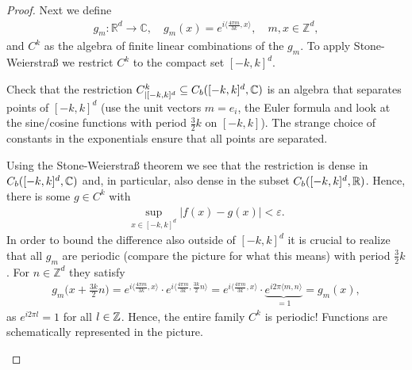 \begin{proof}[Proof]
	Next we define
	\begin{align*}
		g_m \colon \mathbb{R}^d \to \mathbb{C},\quad g_m (x) = e^{ i \langle \frac{4\pi m}{3k}, x \rangle },\quad m, x\in \mathbb{Z}^d,
	\end{align*}
	and $C^k$ as the algebra of finite linear combinations of the $g_m$. To apply Stone-Weierstra\ss{} we restrict $C^k$ to the compact set $[-k,k]^d$.
	\begin{luebung}
		Check that the restriction $C^k_{|[-k,k]^d}\subseteq C_b([-k,k]^d,\mathbb{C})$ is an algebra that separates points of $[-k,k]^d$ (use the unit vectors $m=e_i$, the Euler formula and look at the sine/cosine functions with period $\frac{3}{2} k$ on $[-k,k]$). The strange choice of constants in the exponentials ensure that all points are separated.
	\end{luebung}
	Using the Stone-Weierstra\ss{} theorem we see that the restriction is dense in $C_b([-k,k]^d,\mathbb{C})$ and, in particular, also dense in the subset $C_b([-k,k]^d,\mathbb{R})$. Hence, there is some $g \in C^k$ with 
	\begin{align*}
		\sup_{x\in [-k,k]^d}\lvert f(x) - g(x) \rvert < \varepsilon.
	\end{align*}
	In order to bound the difference also outside of $[-k,k]^d$ it is crucial to realize that all $g_m$ are periodic (compare the picture for what this means) with period $\frac{3}{2}k$. For $n \in \mathbb{Z}^d$ they satisfy
			\begin{align*}
				g_m\Big(x+ \frac{3k}{2} n\Big) = e^{ i \langle \frac{4\pi m}{3k}, x \rangle } \cdot e^{ i \langle \frac{4\pi m}{3k}, \frac{3k}{2} n \rangle } = e^{ i \langle \frac{4\pi m}{3k}, x \rangle } \cdot \underbrace{e^{ i2\pi \langle m,n \rangle }}_{=1} = g_m(x),
			\end{align*}
			as $e^{i 2\pi l}=1$ for all $l\in\mathbb{Z}$.	Hence, the entire family $C^k$ is periodic! Functions are schematically represented in the picture.			
\begin{figure}[h]
	\begin{center}
\end{center}
\end{figure}
\end{proof}
